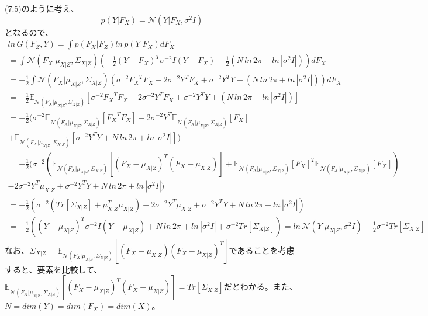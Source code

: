 \documentclass{jsarticle}
\begin{document}
(7.5)のように考え、
\begin{equation}
p(Y | F_X) = \mathcal{N}(Y | F_X, \sigma^{2}I)
\end{equation}
となるので、
\begin{equation}
\begin{split}
ln \, G(F_Z, Y) = \int p(F_X | F_Z) ln \, p(Y | F_X) dF_X\\
= \int  \mathcal{N}(F_X | \mu_{X | Z}, \Sigma_{X | Z}) (-\frac{1}{2}(Y - F_X)^T\sigma^{-2}I(Y - F_X) - \frac{1}{2}(N \, ln \, 2\pi + ln \, |\sigma^2 I|)) dF_X\\
= -\frac{1}{2} \int  \mathcal{N}(F_X | \mu_{X | Z}, \Sigma_{X | Z}) (\sigma^{-2}{F_X}^T F_X - 2\sigma^{-2}Y^T F_X + \sigma^{-2} Y^T Y + (N \, ln \, 2\pi + ln \, |\sigma^2 I|)) dF_X \\
= -\frac{1}{2} \mathbb{E}_{\mathcal{N}(F_X | \mu_{X | Z}, \Sigma_{X | Z})}[\sigma^{-2}{F_X}^T F_X - 2\sigma^{-2}Y^T F_X + \sigma^{-2} Y^T Y + (N \, ln \, 2\pi + ln \, |\sigma^2 I|)]\\
= -\frac{1}{2} (\sigma^{-2} \mathbb{E}_{\mathcal{N}(F_X | \mu_{X | Z}, \Sigma_{X | Z})}[{F_X}^T F_X] - 2\sigma^{-2}Y^T \mathbb{E}_{\mathcal{N}(F_X | \mu_{X | Z}, \Sigma_{X | Z})}[F_X]\\ + \mathbb{E}_{\mathcal{N}(F_X | \mu_{X | Z}, \Sigma_{X | Z})}[\sigma^{-2} Y^T Y + N \, ln \, 2\pi + ln \, |\sigma^2 I|])\\
= -\frac{1}{2} (\sigma^{-2} (\mathbb{E}_{\mathcal{N}(F_X | \mu_{X | Z}, \Sigma_{X | Z})}[(F_X - \mu_{X|Z})^T (F_X - \mu_{X|Z})] + \mathbb{E}_{\mathcal{N}(F_X | \mu_{X | Z}, \Sigma_{X | Z})}[F_X]^T \mathbb{E}_{\mathcal{N}(F_X | \mu_{X | Z}, \Sigma_{X | Z})}[F_X])\\
 - 2\sigma^{-2}Y^T \mu_{X | Z}  + \sigma^{-2} Y^T Y + N \, ln \, 2\pi + ln \, |\sigma^2 I|)\\
= -\frac{1}{2} (\sigma^{-2} (Tr[\Sigma_{X | Z}] + \mu_{X | Z}^T \mu_{X | Z}) - 2\sigma^{-2}Y^T \mu_{X | Z}  + \sigma^{-2} Y^T Y + N \, ln \, 2\pi + ln \, |\sigma^2 I|)\\
= -\frac{1}{2} ((Y - \mu_{X | Z})^T \sigma^{-2} I (Y - \mu_{X | Z}) + N \, ln \, 2\pi + ln \, |\sigma^2 I| + \sigma^{-2} Tr[\Sigma_{X | Z}])
= ln \, \mathcal{N}(Y | \mu_{X | Z}, \sigma^2 I) - \frac{1}{2}\sigma^{-2} Tr[\Sigma_{X | Z}]
\end{split}
\end{equation}
なお、$\Sigma_{X|Z} = \mathbb{E}_{\mathcal{N}(F_X | \mu_{X | Z}, \Sigma_{X | Z})}[(F_X - \mu_{X | Z})(F_X - \mu_{X | Z})^T]$であることを考慮すると、要素を比較して、$\mathbb{E}_{\mathcal{N}(F_X | \mu_{X | Z}, \Sigma_{X | Z})}[(F_X - \mu_{X | Z})^T (F_X - \mu_{X | Z})] = Tr[\Sigma_{X|Z}]$だとわかる。また、$N = dim(Y) = dim(F_X) = dim(X)$。
\end{document}
